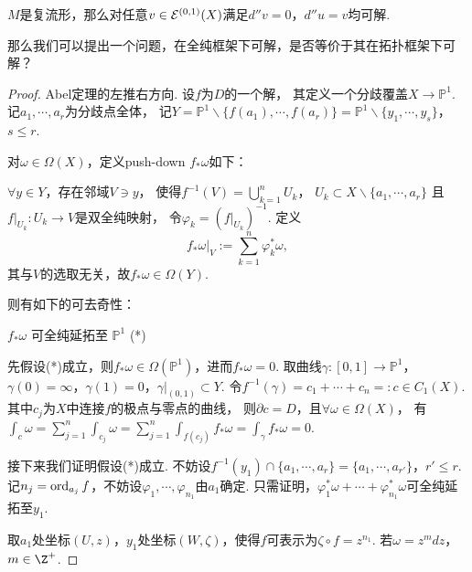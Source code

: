 \begin{remark}[Oka原理]
	$M$是复流形，那么对任意$v\in \mathcal{E}^{(0,1)}(X)$满足$d''v=0$，$d''u=v$均可解.

	那么我们可以提出一个问题，在全纯框架下可解，是否等价于其在拓扑框架下可解？
\end{remark}

\begin{proof}
	Abel定理的左推右方向. 设$f$为$D$的一个解，
    其定义一个分歧覆盖$X\rightarrow \mathbb{P}^1$. 记$a_1,\cdots, a_r$为分歧点全体，
    记$Y=\mathbb{P}^1\backslash \{f(a_1),\cdots,f(a_r)\}
    =\mathbb{P}^1\backslash \{y_1,\cdots,y_s\}$，$s\leq r$.

	对$\omega\in \Omega(X)$，定义push-down $f_*\omega$如下：

	$\forall y\in Y$，存在邻域$V\ni y$，
    使得$f^{-1}(V)=\bigcup\limits_{k=1}^n U_k$，
    $U_k\subset X\backslash \{a_1,\cdots,a_r\}$
    且$f|_{U_k}\colon U_k\rightarrow V$是双全纯映射，
    令$\varphi_k=(f|_{U_k})^{-1}$. 定义
	$$f_*\omega|_V:=\sum\limits_{k=1}^n \varphi_k^*\omega,$$
	其与$V$的选取无关，故$f_*\omega\in \Omega(Y)$.
	
    则有如下的可去奇性：
	\begin{center}
		$f_*\omega$ 可全纯延拓至 $\mathbb{P}^1$ (*)
	\end{center}

	先假设(*)成立，则$f_*\omega\in \Omega(\mathbb{P}^1)$，进而$f_*\omega=0$. 
    取曲线$\gamma\colon [0,1]\rightarrow \mathbb{P}^1$，
    $\gamma(0)=\infty$，$\gamma(1)=0$，$\gamma|_{(0,1)}\subset Y$.
	令$f^{-1}(\gamma)=c_1+\cdots+c_n=:c\in C_1(X)$. 
    其中$c_j$为$X$中连接$f$的极点与零点的曲线，
    则$\partial c=D$，且$\forall \omega\in \Omega(X)$，
    有$\int_c \omega=\sum\limits_{j=1}^n \int_{c_j} \omega=\sum\limits_{j=1}^n \int_{f(c_j)} f_*\omega=\int_{\gamma}f_*\omega=0$.

	接下来我们证明假设(*)成立. 
    不妨设$f^{-1}(y_1)\cap \{a_1,\cdots,a_r\}=\{a_1,\cdots,a_{r'}\}$，$r'\leq r$. 
    记$n_j=\operatorname{ord}_{a_j}f$，不妨设$\varphi_1,\cdots,\varphi_{n_1}$由$a_1$确定. 
    只需证明，$\varphi_1^*\omega+\cdots+\varphi_{n_1}^*\omega$可全纯延拓至$y_1$.

	取$a_1$处坐标$(U,z)$，$y_1$处坐标$(W,\zeta)$，使得$f$可表示为$\zeta\circ f=z^{n_1}$. 
    若$\omega=z^m dz$，$m\in \Z^+$.


\end{proof}
